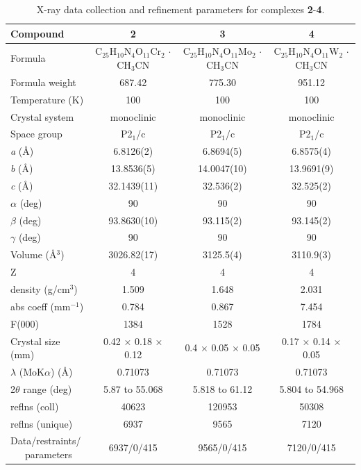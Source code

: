 \begin{table}[]
\centering
\caption{X-ray data collection and refinement parameters for complexes \textbf{2}-\textbf{4}.} \label{tab:xray}
\begin{tabular}{lccc}
\hline
\textbf{Compound} & \textbf{2} & \textbf{3} & \textbf{4} \\ \hline
Formula & \makecell{C$_{25}$H$_{10}$N$_{4}$O$_{11}$Cr$_{2}$ \\ $\cdot$CH$_{3}$CN} & \makecell{C$_{25}$H$_{10}$N$_{4}$O$_{11}$Mo$_{2}$ \\ $\cdot$CH$_{3}$CN} & \makecell{C$_{25}$H$_{10}$N$_{4}$O$_{11}$W$_{2}$ \\ $\cdot$CH$_{3}$CN} \\
Formula weight & 687.42 & 775.30 & 951.12 \\
Temperature (K) & 100 & 100 & 100 \\
Crystal system & monoclinic & monoclinic & monoclinic \\
Space group & P2$_{1}$/c & P2$_{1}$/c & P2$_{1}$/c \\
\textit{a} (\AA) & 6.8126(2) & 6.8694(5) & 6.8575(4) \\
\textit{b} (\AA) & 13.8536(5) & 14.0047(10) & 13.9691(9) \\
\textit{c} (\AA) & 32.1439(11) & 32.536(2) & 32.525(2) \\
$\alpha$ (deg) & 90 & 90 & 90 \\
$\beta$ (deg) & 93.8630(10) & 93.115(2) & 93.145(2) \\
$\gamma$ (deg) & 90 & 90 & 90 \\
Volume (\AA$^{3}$) & 3026.82(17) & 3125.5(4) & 3110.9(3) \\
Z & 4 & 4 & 4 \\
density (g/cm$^{3}$) & 1.509 & 1.648 & 2.031 \\
abs coeff (mm$^{-1}$) & 0.784 & 0.867 & 7.454 \\
F(000) & 1384 & 1528 & 1784 \\
Crystal size (mm) & 0.42 × 0.18 × 0.12 & 0.4 × 0.05 × 0.05 & 0.17 × 0.14 × 0.05 \\
$\lambda$ (MoK$\alpha$) (\AA) & 0.71073 & 0.71073 & 0.71073 \\
2$\theta$ range (deg) & 5.87 to 55.068 & 5.818 to 61.12 & 5.804 to 54.968 \\
reflns (coll) & 40623 & 120953 & 50308 \\
reflns (unique) & 6937 & 9565 & 7120 \\
\makecell[l]{\rule{0pt}{2ex}Data/restraints/\\ ~~~parameters} & 6937/0/415 & 9565/0/415 & 7120/0/415 \\

\end{tabular}
\end{table}
